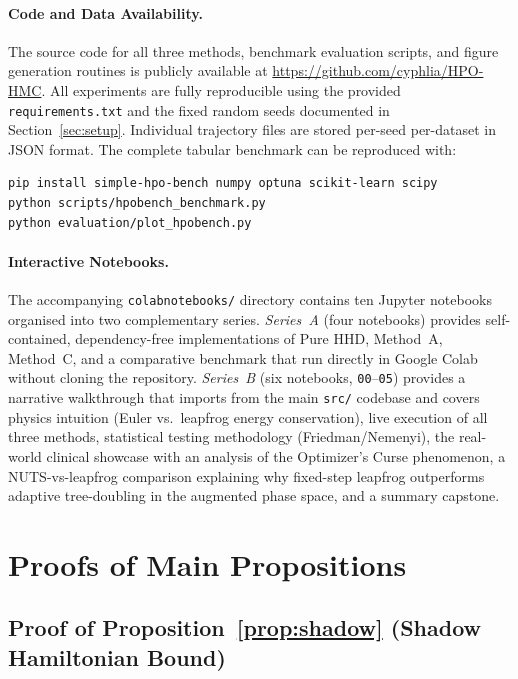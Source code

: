 \documentclass[11pt]{article}
\theoremstyle{definition}
\begin{document}
\paragraph{Code and Data Availability.}
The source code for all three methods, benchmark evaluation scripts,
and figure generation routines is publicly available at
\url{https://github.com/cyphlia/HPO-HMC}.
All experiments are fully reproducible using the provided
\texttt{requirements.txt} and the fixed random seeds documented in
Section~\ref{sec:setup}. Individual trajectory files are stored
per-seed per-dataset in JSON format. The complete tabular benchmark
can be reproduced with:
\begin{verbatim}
pip install simple-hpo-bench numpy optuna scikit-learn scipy
python scripts/hpobench_benchmark.py
python evaluation/plot_hpobench.py
\end{verbatim}

\paragraph{Interactive Notebooks.}
The accompanying \texttt{colabnotebooks/} directory contains ten
Jupyter notebooks organised into two complementary series.
\emph{Series~A} (four notebooks) provides self-contained,
dependency-free implementations of Pure HHD, Method~A, Method~C,
and a comparative benchmark that run directly in Google Colab
without cloning the repository.
\emph{Series~B} (six notebooks, \texttt{00}--\texttt{05}) provides
a narrative walkthrough that imports from the main \texttt{src/}
codebase and covers physics intuition (Euler vs.\ leapfrog energy
conservation), live execution of all three methods, statistical
testing methodology (Friedman/Nemenyi), the real-world clinical
showcase with an analysis of the Optimizer's Curse phenomenon,
a NUTS-vs-leapfrog comparison explaining why fixed-step leapfrog
outperforms adaptive tree-doubling in the augmented phase space,
and a summary capstone.


\appendix

\section{Proofs of Main Propositions}
\label{app:proofs}

\subsection{Proof of Proposition~\ref{prop:shadow} (Shadow Hamiltonian Bound)}
\end{document}
